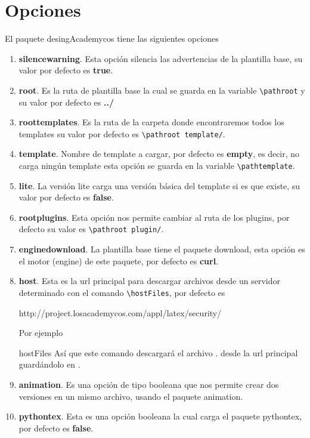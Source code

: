 {	\section{Opciones}
	El paquete desingAcademycos tiene las siguientes opciones
	\begin{enumerate}
		\item \textbf{silencewarning}. Esta opción silencia las advertencias de la plantilla base, su valor por defecto es \textbf{true}.
		\item \textbf{root}. Es la ruta de plantilla base la cual se guarda en la variable \verb|\pathroot| y su valor por defecto es \textbf{../}
		\item \textbf{roottemplates}. Es la ruta de la carpeta donde encontraremos todos los templates su valor por defecto es \verb|\pathroot template/|.
		\item \textbf{template}. Nombre de template a cargar, por defecto es \textbf{empty}, es decir, no carga ningún template  esta opción se guarda en la variable \verb|\pathtemplate|.
		\item \textbf{lite}. La versión lite carga una versión básica del template si es que existe, su valor por defecto es \textbf{false}.
		\item \textbf{rootplugins}. Esta opción nos permite cambiar al ruta de los plugins, por defecto su valor es \verb|\pathroot plugin/|.
		\item \textbf{enginedownload}. La plantilla base tiene el paquete download, esta opción es el motor (engine) de este paquete, por defecto es \textbf{curl}.
		\item \textbf{host}. Esta es la url principal para descargar archivos desde un servidor determinado con el comando \verb|\hostFiles|, por defecto es
		\begin{center}
			http://project.losacademycos.com/appl/latex/security/
		\end{center}
		Por ejemplo 
		\begin{docCommand}{hostFiles}{}
			Así que este comando descargará el archivo . desde la url principal guardándolo en .
		\end{docCommand}
		\item \textbf{animation}. Es una opción de tipo booleana que nos permite crear dos versiones en un mismo archivo, usando el paquete animation.
		\item \textbf{pythontex}. Esta es una opción booleana la cual carga el paquete pythontex, por defecto es \textbf{false}.

\end{enumerate}}
